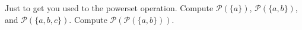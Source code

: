Just to get you used to the powerset operation. Compute $\mathcal{P}(\{a\})$, $\mathcal{P}(\{a, b\})$, and $\mathcal{P}(\{a, b, c\})$. Compute $\mathcal{P}(\mathcal{P}(\{a, b\}))$. 